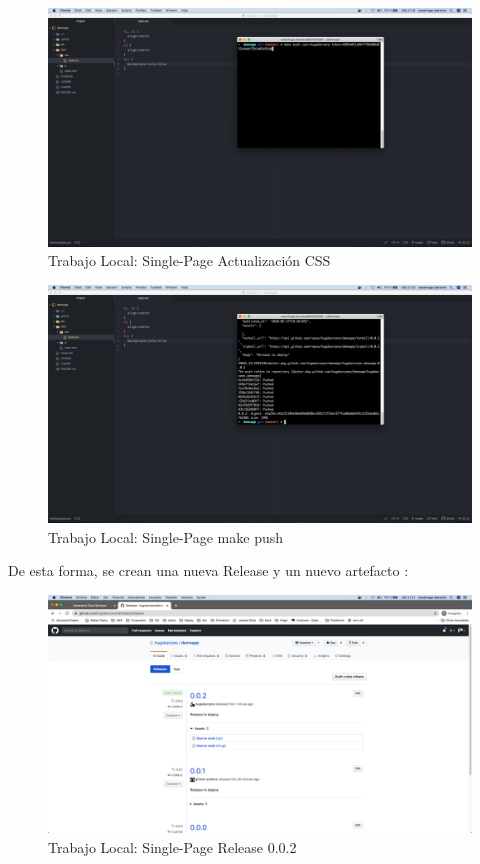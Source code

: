 \documentclass[a4paper,11pt]{book}
\begin{document}
   \begin{figure}[H]
\centering
\includegraphics[scale=0.2]{imagenes/casouso/3_5.png}
\caption{   Trabajo Local: Single-Page Actualización CSS}
\end{figure}

   \begin{figure}[H]
\centering
\includegraphics[scale=0.2]{imagenes/casouso/3_6.png}
\caption{ Trabajo Local: Single-Page make push  }
\end{figure}

De esta forma, se crean una nueva Release y un nuevo artefacto :

   \begin{figure}[H]
\centering
\includegraphics[scale=0.2]{imagenes/casouso/3_7.png}
\caption{  Trabajo Local: Single-Page Release 0.0.2 }
\end{figure}
\end{document}
